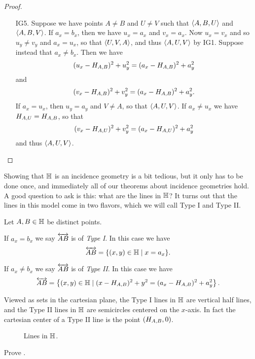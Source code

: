 \begin{proof}
\begin{itemize}
\item[IG5.] Suppose we have points \(A \neq B\) and \(U \neq V\) such that \(\langle A, B, U \rangle\) and \(\langle A, B, V \rangle\).
If \(a_x = b_x\), then we have \(u_x = a_x\) and \(v_x = a_x\).
Now \(u_x = v_x\) and so \(u_y \neq v_y\) and \(a_x = u_x\), so that \(\langle U, V, A \rangle\), and thus \(\langle A, U, V \rangle\) by IG1.
Suppose instead that \(a_x \neq b_x\).
Then we have \[ (u_x - H_{A,B})^2 + u_y^2 = (a_x - H_{A,B})^2 + a_y^2 \] and \[ (v_x - H_{A,B})^2 + v_y^2 = (a_x - H_{A,B})^2 + a_y^2. \]
If \(a_x = u_x\), then \(u_y = a_y\) and \(V \neq A\), so that \(\langle A, U, V \rangle\).
If \(a_x \neq u_x\) we have \(H_{A,U} = H_{A,B}\), so that \[ (v_x - H_{A,U})^2 + v_y^2 = (a_x - H_{A,U})^2 + a_y^2 \] and thus \(\langle A, U, V \rangle\).
\qedhere
\end{itemize}
\end{proof}

Showing that \(\mathbb{H}\) is an incidence geometry is a bit tedious, but it only has to be done once, and immediately all of our theorems about incidence geometries hold.
A good question to ask is this: what are the lines in \(\mathbb{H}\)?
It turns out that the lines in this model come in two flavors, which we will call Type I and Type II.

\begin{cor}
Let \(A, B \in \mathbb{H}\) be distinct points.
\begin{proplist}
\item If \(a_x = b_x\) we say \(\overleftrightarrow{AB}\) is of \emph{Type I}.
In this case we have \[ \overleftrightarrow{AB} = \{ (x,y) \in \mathbb{H} \mid x = a_x \}. \]
\item If \(a_x \neq b_x\) we say \(\overleftrightarrow{AB}\) is of \emph{Type II}.
In this case we have \[ \overleftrightarrow{AB} = \left\{ (x,y) \in \mathbb{H} \mid (x - H_{A,B})^2 + y^2 = (a_x - H_{A,B})^2 + a_y^2 \right\}. \]
\end{proplist}
\end{cor}

Viewed as sets in the cartesian plane, the Type I lines in \(\mathbb{H}\) are vertical half lines, and the Type II lines in \(\mathbb{H}\) are semicircles centered on the \(x\)-axis.
In fact the cartesian center of a Type II line is the point \((H_{A,B},0)\).

\begin{figure}[h]
\begin{center}
\caption{\label{fig:lines-in-hyp-half-plane}Lines in \(\mathbb{H}\).}
\end{center}
\end{figure}



\Exercises%

\begin{exercise}
Prove .
\end{exercise}
